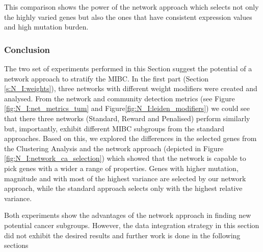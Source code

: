 This comparison shows the power of the network approach which selects not only the highly varied genes but also the ones that have consistent expression values and high mutation burden.

\subsubsection{Conclusion}

The two set of experiments performed in this Section suggest the potential of a network approach to stratify the MIBC. In the first part (Section \ref{s:N_I:weights}), three networks with different weight modifiers were created and analysed. From the network and community detection metrics (see Figure \ref{fig:N_I:net_metrics_tum} and Figure\ref{fig:N_I:leiden_modifiers}) we could see that there three networks (Standard, Reward and Penalised) perform similarly but, importantly, exhibit different MIBC subgroups from the standard approaches. Based on this, we explored the differences in the selected genes from the Clustering Analysis and the network approach (depicted in Figure \ref{fig:N_I:network_ca_selection}) which showed that the network is capable to pick genes with a wider a range of properties. Genes with higher mutation, magnitude and with most of the highest variance are selected by our network approach, while the standard approach selects only with the highest relative variance.

Both experiments show the advantages of the network approach in finding new potential cancer subgroups. However, the data integration strategy in this section did not exhibit the desired results and further work is done in the following sections

\newpage

